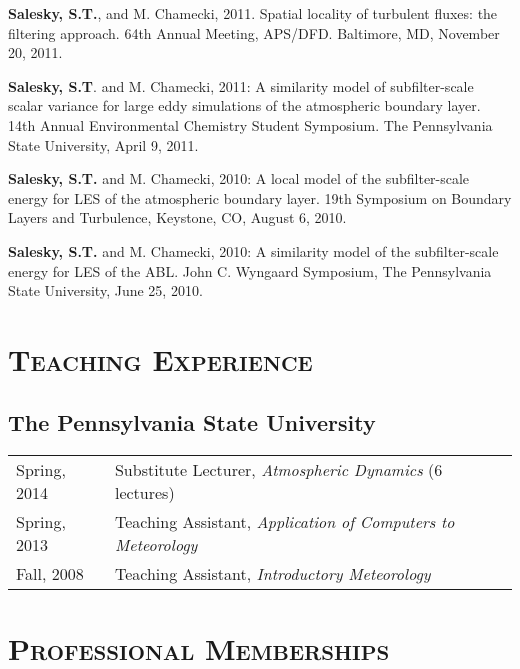 \documentclass[11pt,letterpaper]{article}
\begin{document}
\textbf{Salesky, S.T.}, and M. Chamecki, 2011. Spatial locality of turbulent
fluxes: the filtering approach. 64th Annual Meeting, APS/DFD. Baltimore, MD,
November 20, 2011. 

\textbf{Salesky, S.T}. and M. Chamecki, 2011: A similarity model of
subfilter-scale scalar variance for large eddy simulations of the atmospheric
boundary layer. 14th Annual Environmental Chemistry Student Symposium. The
Pennsylvania State University, April 9, 2011. 

\textbf{Salesky, S.T.} and M. Chamecki, 2010: A local model of the
subfilter-scale energy for LES of the atmospheric boundary layer. 19th
Symposium on Boundary Layers and Turbulence, Keystone, CO, August 6, 2010. 

\textbf{Salesky, S.T.} and M. Chamecki, 2010: A similarity model of the
subfilter-scale energy for LES of the ABL. John C. Wyngaard Symposium, The
Pennsylvania State University, June 25, 2010. 

\section*{\textsc{Teaching Experience}} 
\subsection*{The Pennsylvania State University}

\begin{tabular}{l l}
Spring, 2014 & Substitute Lecturer, \textit{Atmospheric Dynamics} (6 lectures) \\
Spring, 2013 & Teaching Assistant, \textit{Application of Computers to Meteorology} \\
Fall, 2008 & Teaching Assistant, \textit{Introductory Meteorology} \\
\end{tabular}


\section*{\textsc{Professional Memberships}} 
\end{document}
